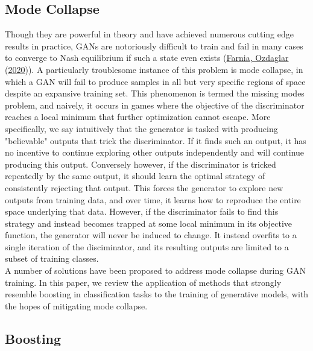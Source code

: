 \documentclass[submission]{eptcs}
\begin{document}
\subsection{Mode Collapse}

Though they are powerful in theory and have achieved numerous cutting edge results in practice, GANs are notoriously difficult to train and fail in many cases to converge to Nash equilibrium if such a state even exists (\href{https://arxiv.org/pdf/2002.09124.pdf#:~:text=GANs%20trained%20using%20first%2D%20order,the%20GAN%20zero%2Dsum%20game.}{Farnia, Ozdaglar (2020)}). A particularly troublesome instance of this problem is mode collapse, in which a GAN will fail to produce samples in all but very specific regions of space despite an expansive training set. This phenomenon is termed the missing modes problem, and naively, it occurs in games where the objective of the discriminator reaches a local minimum that further optimization cannot escape. More specifically, we say intuitively that the generator is tasked with producing "believable" outputs that trick the discriminator. If it finds such an output, it has no incentive to continue exploring other outputs independently and will continue producing this output. Conversely however, if the discriminator is tricked repeatedly by the same output, it should learn the optimal strategy of consistently rejecting that output. This forces the generator to explore new outputs from training data, and over time, it learns how to reproduce the entire space underlying that data. However, if the discriminator fails to find this strategy and instead becomes trapped at some local minimum in its objective function, the generator will never be induced to change. It instead overfits to a single iteration of the disciminator, and its resulting outputs are limited to a subset of training classes. \\

A number of solutions have been proposed to address mode collapse during GAN training. In this paper, we review the application of methods that strongly resemble boosting in classification tasks to the training of generative models, with the hopes of mitigating mode collapse.

\subsection{Boosting}
\end{document}
